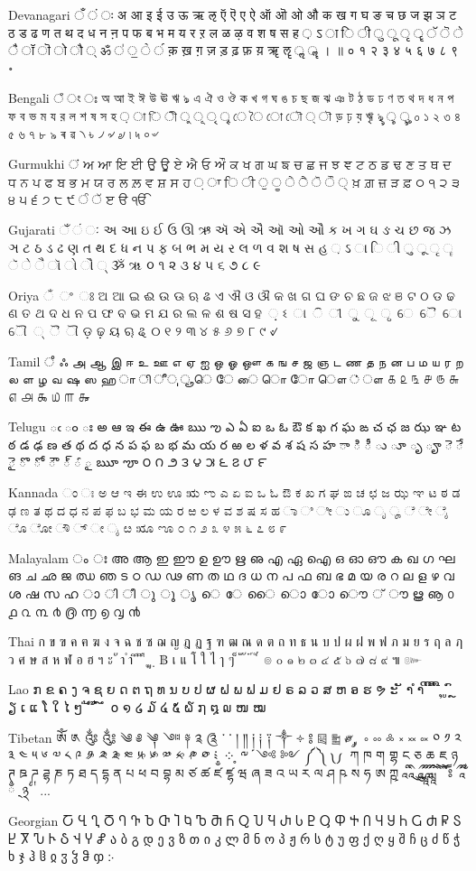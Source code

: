 \documentclass[12pt,twoside]{memoir}
\begin{document}
Devanagari
ँ ं ः अ आ इ ई उ ऊ ऋ ऌ ऍ ऎ ए ऐ ऑ ऒ ओ औ क ख ग घ ङ च छ ज झ ञ ट ठ ड ढ ण त थ द ध न ऩ प फ ब भ म य र ऱ ल ळ ऴ व श ष स ह ़ ऽ ा ि ी ु ू ृ ॄ ॅ ॆ े ै ॉ ॊ ो ौ ् ॐ ॑ ॒ ॓ ॔ क़ ख़ ग़ ज़ ड़ ढ़ फ़ य़ ॠ ॡ ॢ ॣ । ॥ ० १ २ ३ ४ ५ ६ ७ ८ ९ ॰

Bengali
ঁ ং ঃ অ আ ই ঈ উ ঊ ঋ ঌ এ ঐ ও ঔ ক খ গ ঘ ঙ চ ছ জ ঝ ঞ ট ঠ ড ঢ ণ ত থ দ ধ ন প ফ ব ভ ম য র ল শ ষ স হ ় া ি ী ু ূ ৃ ৄ ে ৈ ো ৌ ্ ৗ ড় ঢ় য় ৠ ৡ ৢ ৣ ০ ১ ২ ৩ ৪ ৫ ৬ ৭ ৮ ৯ ৰ ৱ ৲ ৳ ৴ ৵ ৶ ৷ ৸ ৹ ৺

Gurmukhi
ਂ ਅ ਆ ਇ ਈ ਉ ਊ ਏ ਐ ਓ ਔ ਕ ਖ ਗ ਘ ਙ ਚ ਛ ਜ ਝ ਞ ਟ ਠ ਡ ਢ ਣ ਤ ਥ ਦ ਧ ਨ ਪ ਫ ਬ ਭ ਮ ਯ ਰ ਲ ਲ਼ ਵ ਸ਼ ਸ ਹ ਼ ਾ ਿ ੀ ੁ ੂ ੇ ੈ ੋ ੌ ੍ ਖ਼ ਗ਼ ਜ਼ ੜ ਫ਼ ੦ ੧ ੨ ੩ ੪ ੫ ੬ ੭ ੮ ੯ ੰ ੱ ੲ ੳ ੴ

Gujarati
ઁ ં ઃ અ આ ઇ ઈ ઉ ઊ ઋ ઍ એ ઐ ઑ ઓ ઔ ક ખ ગ ઘ ઙ ચ છ જ ઝ ઞ ટ ઠ ડ ઢ ણ ત થ દ ધ ન પ ફ બ ભ મ ય ર લ ળ વ શ ષ સ હ ઼ ઽ ા િ ી ુ ૂ ૃ ૄ ૅ ે ૈ ૉ ો ૌ ્ ૐ ૠ ૦ ૧ ૨ ૩ ૪ ૫ ૬ ૭ ૮ ૯

Oriya
ଁ ଂ ଃ ଅ ଆ ଇ ଈ ଉ ଊ ଋ ଌ ଏ ଐ ଓ ଔ କ ଖ ଗ ଘ ଙ ଚ ଛ ଜ ଝ ଞ ଟ ଠ ଡ ଢ ଣ ତ ଥ ଦ ଧ ନ ପ ଫ ବ ଭ ମ ଯ ର ଲ ଳ ଶ ଷ ସ ହ ଼ ଽ ା ି ୀ ୁ ୂ ୃ େ ୈ ୋ ୌ ୍ ୖ ୗ ଡ଼ ଢ଼ ୟ ୠ ୡ ୦ ୧ ୨ ୩ ୪ ୫ ୬ ୭ ୮ ୯ ୰

Tamil
ஂ ஃ அ ஆ இ ஈ உ ஊ எ ஏ ஐ ஒ ஓ ஔ க ங ச ஜ ஞ ட ண த ந ன ப ம ய ர ற ல ள ழ வ ஷ ஸ ஹ ா ி ீ ு ூ ெ ே ை ொ ோ ௌ ் ௗ ௧ ௨ ௩ ௪ ௫ ௬ ௭ ௮ ௯ ௰ ௱ ௲

Telugu
ఁ ం ః అ ఆ ఇ ఈ ఉ ఊ ఋ ఌ ఎ ఏ ఐ ఒ ఓ ఔ క ఖ గ ఘ ఙ చ ఛ జ ఝ ఞ ట ఠ డ ఢ ణ త థ ద ధ న ప ఫ బ భ మ య ర ఱ ల ళ వ శ ష స హ ా ి ీ ు ూ ృ ౄ ె ే ై ొ ో ౌ ్ ౕ ౖ ౠ ౡ ౦ ౧ ౨ ౩ ౪ ౫ ౬ ౭ ౮ ౯

Kannada
ಂ ಃ ಅ ಆ ಇ ಈ ಉ ಊ ಋ ಌ ಎ ಏ ಐ ಒ ಓ ಔ ಕ ಖ ಗ ಘ ಙ ಚ ಛ ಜ ಝ ಞ ಟ ಠ ಡ ಢ ಣ ತ ಥ ದ ಧ ನ ಪ ಫ ಬ ಭ ಮ ಯ ರ ಱ ಲ ಳ ವ ಶ ಷ ಸ ಹ ಾ ಿ ೀ ು ೂ ೃ ೄ ೆ ೇ ೈ ೊ ೋ ೌ ್ ೕ ೖ ೞ ೠ ೡ ೦ ೧ ೨ ೩ ೪ ೫ ೬ ೭ ೮ ೯

Malayalam
ം ഃ അ ആ ഇ ഈ ഉ ഊ ഋ ഌ എ ഏ ഐ ഒ ഓ ഔ ക ഖ ഗ ഘ ങ ച ഛ ജ ഝ ഞ ട ഠ ഡ ഢ ണ ത ഥ ദ ധ ന പ ഫ ബ ഭ മ യ ര റ ല ള ഴ വ ശ ഷ സ ഹ ാ ി ീ ു ൂ ൃ െ േ ൈ ൊ ോ ൌ ് ൗ ൠ ൡ ൦ ൧ ൨ ൩ ൪ ൫ ൬ ൭ ൮ ൯

Thai
ก ข ฃ ค ฅ ฆ ง จ ฉ ช ซ ฌ ญ ฎ ฏ ฐ ฑ ฒ ณ ด ต ถ ท ธ น บ ป ผ ฝ พ ฟ ภ ม ย ร ฤ ล ฦ ว ศ ษ ส ห ฬ อ ฮ ฯ ะ ั า ำ ิ ี ึ ื ุ ู ฺ ฿ เ แ โ ใ ไ ๅ ๆ ็ ่ ้ ๊ ๋ ์ ํ ๎ ๏ ๐ ๑ ๒ ๓ ๔ ๕ ๖ ๗ ๘ ๙ ๚ ๛

Lao
ກ ຂ ຄ ງ ຈ ຊ ຍ ດ ຕ ຖ ທ ນ ບ ປ ຜ ຝ ພ ຟ ມ ຢ ຣ ລ ວ ສ ຫ ອ ຮ ຯ ະ ັ າ ຳ ິ ີ ຶ ື ຸ ູ ົ ຼ ຽ ເ ແ ໂ ໃ ໄ ໆ ່ ້ ໊ ໋ ໌ ໍ ໐ ໑ ໒ ໓ ໔ ໕ ໖ ໗ ໘ ໙ ໜ ໝ

Tibetan
ༀ ༁ ༂ ༃ ༄ ༅ ༆ ༇ ༈ ༉ ༊ ་ ༌ ། ༎ ༏ ༐ ༑ ༒ ༓ ༔ ༕ ༖ ༗ ༘ ༙ ༚ ༛ ༜ ༝ ༞ ༟ ༠ ༡ ༢ ༣ ༤ ༥ ༦ ༧ ༨ ༩ ༪ ༫ ༬ ༭ ༮ ༯ ༰ ༱ ༲ ༳ ༴ ༵ ༶ ༷ ༸ ༹ ༺ ༻ ༼ ༽ ༾ ༿ ཀ ཁ ག གྷ ང ཅ ཆ ཇ ཉ ཊ ཋ ཌ ཌྷ ཎ ཏ ཐ ད དྷ ན པ ཕ བ བྷ མ ཙ ཚ ཛ ཛྷ ཝ ཞ ཟ འ ཡ ར ལ ཤ ཥ ས ཧ ཨ ཀྵ ཱ ི ཱི ུ ཱུ ྲྀ ཷ ླྀ ཹ ེ ཻ ོ ཽ ཾ ཿ ྀ ཱྀ ྂ ྃ ྄ ྅ ྆ ྇ ...

Georgian
Ⴀ Ⴁ Ⴂ Ⴃ Ⴄ Ⴅ Ⴆ Ⴇ Ⴈ Ⴉ Ⴊ Ⴋ Ⴌ Ⴍ Ⴎ Ⴏ Ⴐ Ⴑ Ⴒ Ⴓ Ⴔ Ⴕ Ⴖ Ⴗ Ⴘ Ⴙ Ⴚ Ⴛ Ⴜ Ⴝ Ⴞ Ⴟ Ⴠ Ⴡ Ⴢ Ⴣ Ⴤ Ⴥ ა ბ გ დ ე ვ ზ თ ი კ ლ მ ნ ო პ ჟ რ ს ტ უ ფ ქ ღ ყ შ ჩ ც ძ წ ჭ ხ ჯ ჰ ჱ ჲ ჳ ჴ ჵ ჶ ჻
\end{document}
